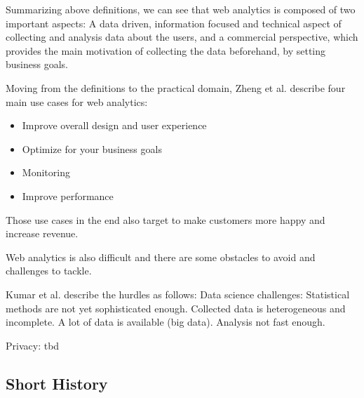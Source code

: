 


Summarizing above definitions, we can see that web analytics is composed of two important aspects: A data driven, information focused and technical aspect of collecting and analysis data about the users, and a commercial perspective, which provides the main motivation of collecting the data beforehand, by setting business goals.


Moving from the definitions to the practical domain, Zheng et al. describe four main use cases for web analytics:

\begin{itemize}
\item Improve overall design and user experience
\item Optimize for your business goals
\item Monitoring
\item Improve performance
\end{itemize}

Those use cases in the end also target to make customers more happy and increase revenue.


Web analytics is also difficult and there are some obstacles to avoid and challenges to tackle.

Kumar et al. describe the hurdles as follows:
Data science challenges:
Statistical methods are not yet sophisticated enough.
Collected data is heterogeneous and incomplete.
A lot of data is available (big data).
Analysis not fast enough.

Privacy: tbd






\subsection{Short History}

